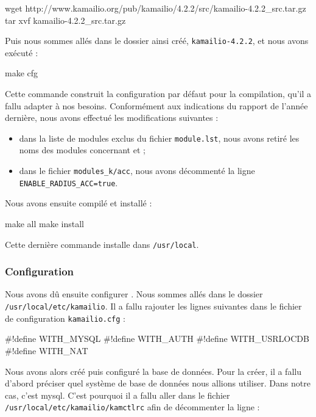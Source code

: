 \begin{shellcode}
wget http://www.kamailio.org/pub/kamailio/4.2.2/src/kamailio-4.2.2_src.tar.gz
tar xvf kamailio-4.2.2_src.tar.gz
\end{shellcode}

Puis nous sommes allés dans le dossier ainsi créé, \texttt{kamailio-4.2.2}, et nous avons exécuté :

\begin{shellcode}
make cfg
\end{shellcode}

Cette commande construit la configuration par défaut pour la compilation, qu’il a fallu adapter à nos besoins. Conformément aux indications du rapport de l’année dernière, nous avons effectué les modifications suivantes :

\begin{itemize}
	\item{dans la liste de modules exclus du fichier \texttt{module.lst}, nous avons retiré les noms des modules concernant {\my} et {\rad}} ;
	\item{dans le fichier \texttt{modules\_k/acc}, nous avons décommenté la ligne \texttt{ENABLE\_RADIUS\_ACC=true}}.
\end{itemize}

Nous avons ensuite compilé et installé {\kam} :

\begin{shellcode}
make all
make install
\end{shellcode}

Cette dernière commande installe {\kam} dans \texttt{/usr/local}.

\subsubsection{Configuration}

Nous avons dû ensuite configurer {\kam}. Nous sommes allés dans le dossier \texttt{/usr/local/etc/kamailio}. Il a fallu rajouter les lignes suivantes dans le fichier de configuration \texttt{kamailio.cfg} :

\begin{kamcf}
#!define WITH_MYSQL
#!define WITH_AUTH
#!define WITH_USRLOCDB
#!define WITH_NAT
\end{kamcf}

Nous avons alors créé puis configuré la base de données. Pour la créer, il a fallu d'abord préciser quel système de base de données nous allions utiliser.
Dans notre cas, c'est mysql. C'est pourquoi il a fallu aller dans le fichier \texttt{/usr/local/etc/kamailio/kamctlrc} afin de décommenter la ligne :

